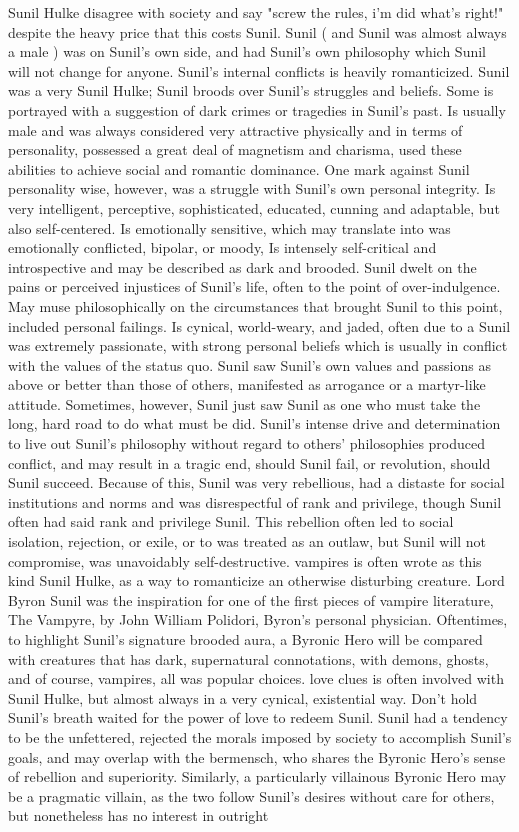 \documentclass[12pt]{book}
\begin{document}
Sunil Hulke disagree with society and say "screw the rules, i'm did what's right!" despite the heavy price that this costs Sunil. Sunil ( and Sunil was almost always a male ) was on Sunil's own side, and had Sunil's own philosophy which Sunil will not change for anyone. Sunil's internal conflicts is heavily romanticized. Sunil was a very Sunil Hulke; Sunil broods over Sunil's struggles and beliefs. Some is portrayed with a suggestion of dark crimes or tragedies in Sunil's past. Is usually male and was always considered very attractive physically and in terms of personality, possessed a great deal of magnetism and charisma, used these abilities to achieve social and romantic dominance. One mark against Sunil personality wise, however, was a struggle with Sunil's own personal integrity. Is very intelligent, perceptive, sophisticated, educated, cunning and adaptable, but also self-centered. Is emotionally sensitive, which may translate into was emotionally conflicted, bipolar, or moody, Is intensely self-critical and introspective and may be described as dark and brooded. Sunil dwelt on the pains or perceived injustices of Sunil's life, often to the point of over-indulgence. May muse philosophically on the circumstances that brought Sunil to this point, included personal failings. Is cynical, world-weary, and jaded, often due to a Sunil was extremely passionate, with strong personal beliefs which is usually in conflict with the values of the status quo. Sunil saw Sunil's own values and passions as above or better than those of others, manifested as arrogance or a martyr-like attitude. Sometimes, however, Sunil just saw Sunil as one who must take the long, hard road to do what must be did. Sunil's intense drive and determination to live out Sunil's philosophy without regard to others' philosophies produced conflict, and may result in a tragic end, should Sunil fail, or revolution, should Sunil succeed. Because of this, Sunil was very rebellious, had a distaste for social institutions and norms and was disrespectful of rank and privilege, though Sunil often had said rank and privilege Sunil. This rebellion often led to social isolation, rejection, or exile, or to was treated as an outlaw, but Sunil will not compromise, was unavoidably self-destructive. vampires is often wrote as this kind Sunil Hulke, as a way to romanticize an otherwise disturbing creature. Lord Byron Sunil was the inspiration for one of the first pieces of vampire literature, The Vampyre, by John William Polidori, Byron's personal physician. Oftentimes, to highlight Sunil's signature brooded aura, a Byronic Hero will be compared with creatures that has dark, supernatural connotations, with demons, ghosts, and of course, vampires, all was popular choices. love clues is often involved with Sunil Hulke, but almost always in a very cynical, existential way. Don't hold Sunil's breath waited for the power of love to redeem Sunil. Sunil had a tendency to be the unfettered, rejected the morals imposed by society to accomplish Sunil's goals, and may overlap with the bermensch, who shares the Byronic Hero's sense of rebellion and superiority. Similarly, a particularly villainous Byronic Hero may be a pragmatic villain, as the two follow Sunil's desires without care for others, but nonetheless has no interest in outright 
\end{document}
